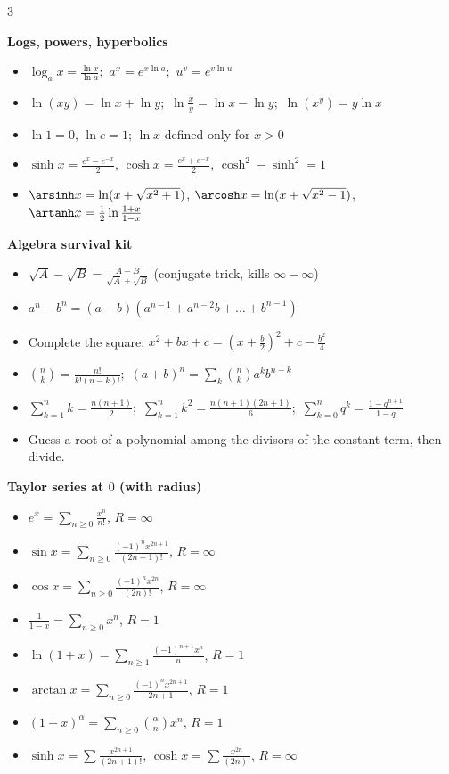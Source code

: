 \begin{multicols}{3}
{\columnbreak

\textbf{\sffamily\color{subText}Logs, powers, hyperbolics}
\begin{itemize}[noitemsep,topsep=0pt,leftmargin=*]
\item $\log_a x=\frac{\ln x}{\ln a}$;\ $a^x=e^{x\ln a}$;\ $u^v=e^{v\ln u}$
\item $\ln(xy)=\ln x+\ln y$;\ $\ln\frac xy=\ln x-\ln y$;\ $\ln(x^y)=y\ln x$
\item $\ln1=0$, $\ln e=1$; $\ln x$ defined only for $x>0$
\item $\sinh x=\frac{e^x-e^{-x}}2$, $\cosh x=\frac{e^x+e^{-x}}2$, $\cosh^2-\sinh^2=1$
\item $\arsinh x=\ln(x+\sqrt{x^2+1})$, $\arcosh x=\ln(x+\sqrt{x^2-1})$, $\artanh x=\frac12\ln\frac{1+x}{1-x}$
\end{itemize}

\vspace{2pt}
\textbf{\sffamily\color{subText}Algebra survival kit}
\begin{itemize}[noitemsep,topsep=0pt,leftmargin=*]
\item $\sqrt A-\sqrt B=\frac{A-B}{\sqrt A+\sqrt B}$ (conjugate trick, kills $\infty-\infty$)
\item $a^n-b^n=(a-b)(a^{n-1}+a^{n-2}b+\dots+b^{n-1})$
\item Complete the square: $x^2+bx+c=\left(x+\frac b2\right)^2+c-\frac{b^2}4$
\item $\binom nk=\frac{n!}{k!(n-k)!}$;\ $(a+b)^n=\sum_k\binom nka^kb^{n-k}$
\item $\sum_{k=1}^nk=\frac{n(n+1)}2$;\ $\sum_{k=1}^nk^2=\frac{n(n+1)(2n+1)}6$;\ $\sum_{k=0}^nq^k=\frac{1-q^{n+1}}{1-q}$
\item Guess a root of a polynomial among the divisors of the constant term, then divide.
\end{itemize}

\vspace{2pt}
\textbf{\sffamily\color{subText}Taylor series at $0$ (with radius)}
\begin{itemize}[noitemsep,topsep=0pt,leftmargin=*]
\item $e^x=\sum_{n\ge0}\frac{x^n}{n!}$, $R=\infty$
\item $\sin x=\sum_{n\ge0}\frac{(-1)^nx^{2n+1}}{(2n+1)!}$, $R=\infty$
\item $\cos x=\sum_{n\ge0}\frac{(-1)^nx^{2n}}{(2n)!}$, $R=\infty$
\item $\frac1{1-x}=\sum_{n\ge0}x^n$, $R=1$
\item $\ln(1+x)=\sum_{n\ge1}\frac{(-1)^{n+1}x^n}{n}$, $R=1$
\item $\arctan x=\sum_{n\ge0}\frac{(-1)^nx^{2n+1}}{2n+1}$, $R=1$
\item $(1+x)^\alpha=\sum_{n\ge0}\binom\alpha nx^n$, $R=1$
\item $\sinh x=\sum\frac{x^{2n+1}}{(2n+1)!}$, $\cosh x=\sum\frac{x^{2n}}{(2n)!}$, $R=\infty$
\end{itemize}

}
\end{multicols}
